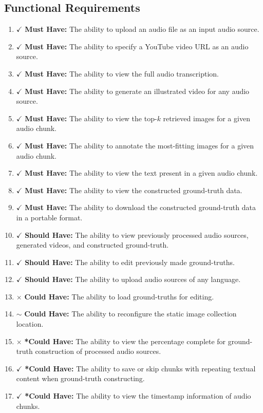 \documentclass{l4proj}
\begin{document}
\subsection{Functional Requirements}
\begin{enumerate}
    \item {\color{forestgreen} $\checkmark$ \textbf{Must Have:} The ability to upload an audio file as an input audio source.}
    \item {\color{forestgreen} $\checkmark$ \textbf{Must Have:} The ability to specify a YouTube video URL as an audio source.}
    \item {\color{forestgreen} $\checkmark$ \textbf{Must Have:} The ability to view the full audio transcription.}
    \item {\color{forestgreen} $\checkmark$ \textbf{Must Have:} The ability to generate an illustrated video for any audio source.}
    \item {\color{forestgreen} $\checkmark$ \textbf{Must Have:} The ability to view the top-$k$ retrieved images for a given audio chunk.}
    \item {\color{forestgreen} $\checkmark$ \textbf{Must Have:} The ability to annotate the most-fitting images for a given audio chunk.}
    \item {\color{forestgreen} $\checkmark$ \textbf{Must Have:} The ability to view the text present in a given audio chunk.}
    \item {\color{forestgreen} $\checkmark$ \textbf{Must Have:} The ability to view the constructed ground-truth data.}
    \item {\color{forestgreen} $\checkmark$ \textbf{Must Have:} The ability to download the constructed ground-truth data in a portable format.}
    \item {\color{forestgreen} $\checkmark$ \textbf{Should Have:} The ability to view previously processed audio sources, generated videos, and constructed ground-truth.}
    \item {\color{forestgreen} $\checkmark$ \textbf{Should Have:} The ability to edit previously made ground-truths.}
    \item {\color{forestgreen} $\checkmark$ \textbf{Should Have:} The ability to upload audio sources of any language.}
    \item \label{reqs:13} {\color{brickred} $\times$ \textbf{Could Have:} The ability to load ground-truths for editing.}
    \item \label{reqs:14} {\color{golden} $\sim$ \textbf{Could Have:} The ability to reconfigure the static image collection location.}
    \item \label{reqs:15} {\color{brickred} $\times$ \textbf{*Could Have:} The ability to view the percentage complete for ground-truth construction of processed audio sources.}
    \item {\color{forestgreen} $\checkmark$ \textbf{*Could Have:} The ability to save or skip chunks with repeating textual content when ground-truth constructing.}
    \item {\color{forestgreen} $\checkmark$ \textbf{*Could Have:} The ability to view the timestamp information of audio chunks.}
\end{enumerate}
\end{document}
